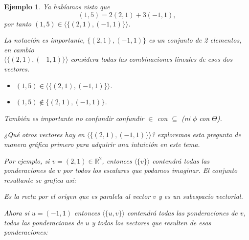\documentclass[12pt]{book}
\newtheorem{ejem}{Ejemplo}
\def\R{\mathbb{R}}
\begin{document}
\vspace{0.2 cm}

\begin{ejem}
{\em Ya habíamos visto que 
$$(1,5)=2(2,1)+3(-1,1),$$
por tanto $(1,5)\in\langle\{(2,1),(-1,1)\}\rangle$.

La notaci\'on es importante, $\{(2,1),(-1,1)\}$ es un conjunto de 2 elementos, en cambio\\
 $\langle\{(2,1),(-1,1)\}\rangle$ considera todas las combinaciones lineales de esos dos vectores.
\begin{itemize}
\item $(1,5)\in \langle\{(2,1),(-1,1)\}\rangle$.
\item $(1,5)\notin\{(2,1),(-1,1)\}$.
\end{itemize}
También es importante no confundir confundir $\in$ con $\subseteq$ (ni $\phi$ con $\Theta$).



¿Qué otros vectores hay en $\langle\{(2,1),(-1,1)\}\rangle$? exploremos esta pregunta de manera gráfica primero para adquirir una intuición en este tema.

Por ejemplo, si $v=(2,1)\in\R^2$, entonces $\langle\{v\}\rangle$ contendrá todas las ponderaciones de $v$ por todos los escalares que podamos imaginar. El conjunto resultante se grafica así:

\begin{center}
\end{center}
Es la recta por el origen que es paralela al vector $v$ y es un subespacio vectorial.

Ahora si $u=(-1,1)$ entonces $\langle\{u,v\}\rangle$ contendrá todas las ponderaciones de $v$, todas las ponderaciones de $u$ y todos los vectores que resulten de esas ponderaciones:

\begin{center}
\end{center}}
\end{ejem}
\end{document}
